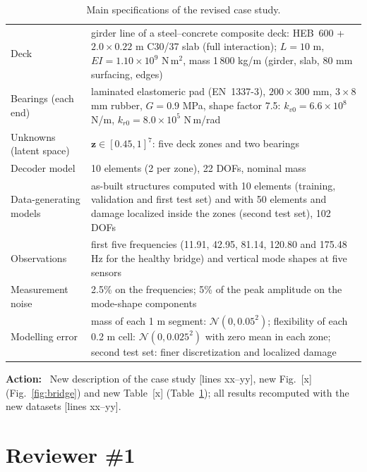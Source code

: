 \documentclass[11pt]{article}
\newenvironment{action}{\par\smallskip\noindent\color{resp}\textbf{Action:}\ }{\par}
\newcommand{\tbd}[1]{\textcolor{note}{\textsf{[#1]}}}
\newcommand{\lines}[1]{\tbd{lines #1}}
\newcommand{\z}{\mathbf{z}}
\begin{document}
\begin{table}[H]
\centering\small
\caption{Main specifications of the revised case study.}
\label{tab:specs}
\begin{tabular}{p{3.9cm}p{11cm}}
\toprule
Deck & girder line of a steel--concrete composite deck: HEB~600 + $2.0\times0.22$ m C30/37 slab (full interaction);
$L=10$ m, $EI=1.10\times10^{9}$ N\,m$^2$, mass 1\,800 kg/m (girder, slab, 80 mm surfacing, edges) \\
Bearings (each end) & laminated elastomeric pad (EN~1337-3), $200\times300$ mm, $3\times8$ mm rubber, $G=0.9$ MPa,
shape factor 7.5: $k_{v0}=6.6\times10^{8}$ N/m, $k_{r0}=8.0\times10^{5}$ N\,m/rad \\
Unknowns (latent space) & $\z\in[0.45,1]^7$: five deck zones and two bearings \\
Decoder model & 10 elements (2 per zone), 22 DOFs, nominal mass \\
Data-generating models & as-built structures computed with 10 elements (training, validation and first test set) and
with 50 elements and damage localized inside the zones (second test set), 102 DOFs \\
Observations & first five frequencies (11.91, 42.95, 81.14, 120.80 and 175.48 Hz for the healthy bridge) and vertical
mode shapes at five sensors \\
Measurement noise & 2.5\% on the frequencies; 5\% of the peak amplitude on the mode-shape components \\
Modelling error & mass of each 1 m segment: $\mathcal{N}(0,0.05^2)$; flexibility of each 0.2 m cell:
$\mathcal{N}(0,0.025^2)$ with zero mean in each zone; second test set: finer discretization and localized damage \\
\bottomrule
\end{tabular}
\end{table}

\begin{action}
New description of the case study \lines{xx--yy}, new Fig.~\tbd{x} (Fig.~\ref{fig:bridge}) and new Table~\tbd{x}
(Table~\ref{tab:specs}); all results recomputed with the new datasets \lines{xx--yy}.
\end{action}

\section{Reviewer \#1}
\end{document}
